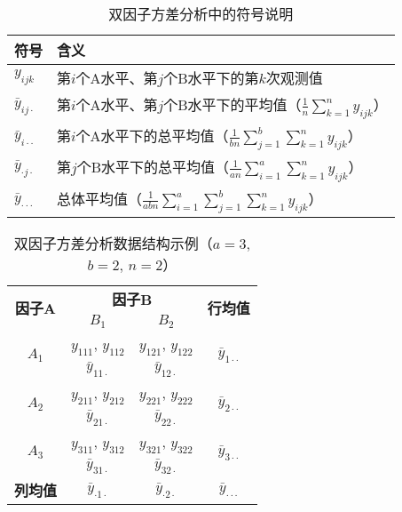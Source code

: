 \documentclass[12pt, a4paper]{amsart}
\begin{document}
\begin{table}[h!]
\centering
\caption{双因子方差分析中的符号说明}
\begin{tabular}{ll}
\toprule
\textbf{符号} & \textbf{含义} \\
\midrule
$y_{ijk}$ & 第$i$个A水平、第$j$个B水平下的第$k$次观测值 \\
$\bar{y}_{ij\cdot}$ & 第$i$个A水平、第$j$个B水平下的平均值（$\frac{1}{n}\sum_{k=1}^{n}y_{ijk}$） \\
$\bar{y}_{i\cdot\cdot}$ & 第$i$个A水平下的总平均值（$\frac{1}{bn}\sum_{j=1}^{b}\sum_{k=1}^{n}y_{ijk}$） \\
$\bar{y}_{\cdot j\cdot}$ & 第$j$个B水平下的总平均值（$\frac{1}{an}\sum_{i=1}^{a}\sum_{k=1}^{n}y_{ijk}$） \\
$\bar{y}_{\cdot\cdot\cdot}$ & 总体平均值（$\frac{1}{abn}\sum_{i=1}^{a}\sum_{j=1}^{b}\sum_{k=1}^{n}y_{ijk}$） \\
\bottomrule
\end{tabular}
\end{table}
\begin{table}[h!]
\centering
\caption{双因子方差分析数据结构示例（$a=3$, $b=2$, $n=2$）}
\begin{tabular}{c|cc|c}
\toprule
\multirow{2}{*}{\textbf{因子A}} & \multicolumn{2}{c|}{\textbf{因子B}} & \multirow{2}{*}{\textbf{行均值}} \\
\cline{2-3}
& $B_1$ & $B_2$ & \\
\midrule
\multirow{2}{*}{$A_1$} & \cellcolor{blue!10}$y_{111}$, \cellcolor{blue!10}$y_{112}$ & \cellcolor{green!10}$y_{121}$, \cellcolor{green!10}$y_{122}$ & \multirow{2}{*}{$\bar{y}_{1\cdot\cdot}$} \\
& \cellcolor{blue!10}$\bar{y}_{11\cdot}$ & \cellcolor{green!10}$\bar{y}_{12\cdot}$ & \\
\hline
\multirow{2}{*}{$A_2$} & \cellcolor{blue!20}$y_{211}$, \cellcolor{blue!20}$y_{212}$ & \cellcolor{green!20}$y_{221}$, \cellcolor{green!20}$y_{222}$ & \multirow{2}{*}{$\bar{y}_{2\cdot\cdot}$} \\
& \cellcolor{blue!20}$\bar{y}_{21\cdot}$ & \cellcolor{green!20}$\bar{y}_{22\cdot}$ & \\
\hline
\multirow{2}{*}{$A_3$} & \cellcolor{blue!30}$y_{311}$, \cellcolor{blue!30}$y_{312}$ & \cellcolor{green!30}$y_{321}$, \cellcolor{green!30}$y_{322}$ & \multirow{2}{*}{$\bar{y}_{3\cdot\cdot}$} \\
& \cellcolor{blue!30}$\bar{y}_{31\cdot}$ & \cellcolor{green!30}$\bar{y}_{32\cdot}$ & \\
\hline
\textbf{列均值} & \cellcolor{yellow!15}$\bar{y}_{\cdot 1\cdot}$ & \cellcolor{yellow!15}$\bar{y}_{\cdot 2\cdot}$ & \cellcolor{orange!15}$\bar{y}_{\cdot\cdot\cdot}$ \\
\bottomrule
\end{tabular}
\end{table}
\end{document}
